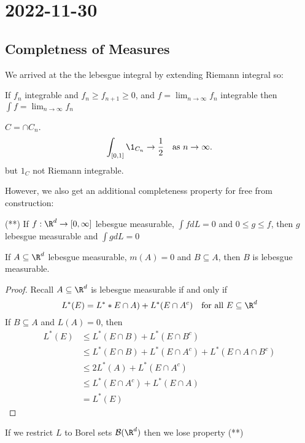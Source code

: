 \section{2022-11-30}

\subsection{Completness of Measures}

We arrived at the the lebesgue integral by extending Riemann integral so:

If $f_n$ integrable and $f_n \geq f_{n+1} \geq 0$, and $f = \lim_{n\to \infty} f_n$ integrable then $\int f = \lim_{n \to \infty} f_n$

\begin{example}
	$C = \cap C_n$.
	 \[
		 \int_{[0,1]} \1_{C_n} \to \frac{1}{2} \quad \text{as } n \to \infty.
	\]
	but $1_{C}$ not Riemann integrable.
\end{example}

However, we also get an additional completeness property for free from construction:


(**) If $f : \R^d \to [0,\infty]$ lebesgue measurable, $\int f dL = 0$ and $0 \leq g \leq f$, then $g$ lebesgue measurable and $\int g dL = 0$


 \begin{lemma}
	If $A \subseteq \R^d$ lebesgue measurable, $m(A) = 0$ and $B \subseteq  A$, then $B$ is lebesgue measurable.
\end{lemma}

\begin{proof}
	Recall $A \subseteq \R^d$ is lebesgue measurable if and only if
	\[
		L^*(E) = L^**E \cap A) + L^* (E \cap A^c) \quad \text{for all } E \subseteq \R^d
	\]
	If $B \subseteq A$ and $L(A) = 0$, then 
	\begin{align*}
		L^*(E) &\leq L^*(E \cap B) + L^*(E \cap B^c) \\
			   &\leq L^*(E \cap B) + L^*(E \cap A^c) + L^*(E \cap A \cap B^c) \\
			   &\leq 2 L^*(A) + L^*(E \cap A^c) \\
			   &\leq L^*(E \cap A^c) + L^*(E \cap A) \\
			   &= L^*(E)
	\end{align*} 
\end{proof}

\begin{remark}
	If we restrict $L$ to Borel sets $\B(\R^d)$ then we lose property (**)
\end{remark}

